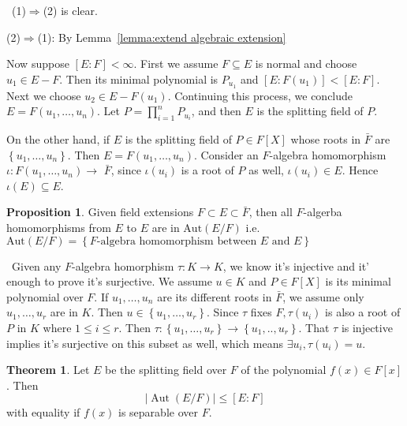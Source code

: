 \documentclass[a4paper,12pt]{article}
\newenvironment{prooff}{{\noindent\it\textcolor{cyan!40!black}{Proof}:}\,}{\par}
\newcommand{\bbrace}[1]{\left\{ #1 \right\} }
\theoremstyle{definition}
\newtheorem{theo}[defn]{Theorem}
\newtheorem{prop}[defn]{Proposition}
\begin{document}
\begin{prooff}
    (1)$\Longrightarrow $(2) is clear.

    (2)$\Longrightarrow $(1): By Lemma~\ref{lemma:extend algebraic extension}

    Now suppose $[E: F]<\infty$. First we assume $F \subseteq E$ is normal and choose $u_1 \in E-F$. Then its minimal polynomial is $P_{u_1}$ and $\left[E: F\left(u_1\right)\right]<[E: F]$. Next we choose $u_2 \in E-F\left(u_1\right)$. Continuing this process, we conclude $E=F\left(u_1, \ldots, u_n\right)$. Let $P=\prod_{i=1}^n P_{u_i}$, and then $E$ is the splitting field of $P$.

    On the other hand, if $E$ is the splitting field of $P \in F[X]$ whose roots in $\bar{F}$ are $\left\{u_1, \ldots, u_n\right\}$. Then $E=F\left(u_1, \ldots, u_n\right)$. Consider an $F$-algebra homomorphism $\iota: F\left(u_1, \ldots, u_n\right) \rightarrow$ $\bar{F}$, since $\iota\left(u_i\right)$ is a root of $P$ as well, $\iota\left(u_i\right) \in E$. Hence $\iota(E) \subseteq E$.

\end{prooff}

\begin{prop}
    Given field extensions $F\subset E\subset \bar{F}$, then all $F$-algerba homomorphisms from $E$ to $E$ are in $\text{Aut}(E/F)$ i.e. $\text{Aut}(E/F)={\bbrace{ F\text{-algebra homomorphism between } E \text{ and } E  }}$
    \label{proposition:F algebra hom is surjective}
\end{prop}
\begin{prooff}
    Given any $F$-algebra homorphism $\tau: K \rightarrow K$, we know it's injective and it' enough to prove it's surjective. We assume $u \in K$ and $P \in F[X]$ is its minimal polynomial over $F$. If $u_1, \ldots, u_n$ are its different roots in $\bar{F}$, we assume only $u_1, \ldots, u_r$ are in $K$. Then $u \in\left\{u_1, \ldots, u_r\right\}$. Since $\tau$ fixes $F, \tau\left(u_i\right)$ is also a root of $P$ in $K$ where $1 \leq i \leq r$. Then $\tau:\left\{u_1, \ldots, u_r\right\} \rightarrow\left\{u_1, . ., u_r\right\}$. That $\tau$ is injective implies it's surjective on this subset as well, which means $\exists u_i, \tau\left(u_i\right)=u$.
\end{prooff}





\begin{theo}
    Let $E$ be the splitting field over $F$ of the polynomial $f(x) \in F[x]$. Then
    $$
        |\operatorname{Aut}(E/F)| \le [E: F]
    $$
    with equality if $f(x)$ is separable over $F$.
\end{theo}
\end{document}
